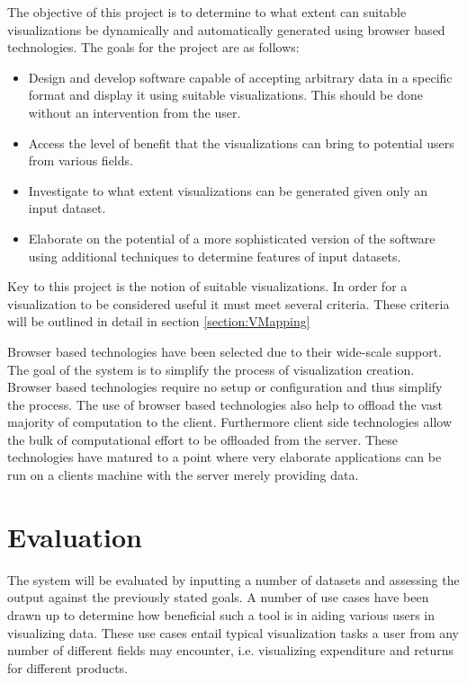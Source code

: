 \documentclass[a4paper, 11pt, titlepage, onehalfspacing]{report}
\begin{document}
The objective of this project is to determine to what extent can suitable visualizations be dynamically and automatically generated using browser based technologies. The goals for the project are as follows:
\begin{itemize}
\item Design and develop software capable of accepting arbitrary data in a specific format and display it using suitable visualizations. This should be done without an intervention from the user.
\item Access the level of benefit that the visualizations can bring to potential users from various fields.
\item Investigate to what extent visualizations can be generated given only an input dataset.
\item Elaborate on the potential of a more sophisticated version of the software using additional techniques to determine features of input datasets.
\end{itemize}
Key to this project is the notion of suitable visualizations. In order for a visualization to be considered useful it must meet several criteria. These criteria will be outlined in detail in section \ref{section:VMapping} 

Browser based technologies have been selected due to their wide-scale support. The goal of the system is to simplify the process of visualization creation. Browser based technologies require no setup or configuration and thus simplify the process. The use of browser based technologies also help to offload the vast majority of computation to the client. Furthermore client side technologies allow the bulk of computational effort to be offloaded from the server. These technologies have matured to a point where very elaborate applications can be run on a clients machine with the server merely providing data.


	\section{Evaluation}

The system will be evaluated by inputting a number of datasets and assessing the output against the previously stated goals. A number of use cases have been drawn up to determine how beneficial such a tool is in aiding various users in visualizing data. These use cases entail typical visualization tasks a user from any number of different fields may encounter, i.e. visualizing expenditure and returns for different products.
\end{document}
